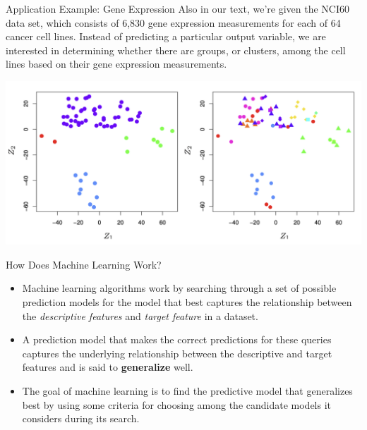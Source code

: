 \documentclass[aspectratio=169,xcolor=dvipsnames]{beamer}
\begin{document}

\begin{frame}{Application Example: Gene Expression}
Also in our text, we're given the NCI60 data set, which consists of 6,830 gene expression measurements for each of 64 cancer cell lines. Instead of predicting a particular output variable, we are interested in determining whether there are groups, or clusters, among the cell lines based on their gene expression measurements.

\begin{center}
\includegraphics[scale=0.4]{images/gene_expr.png}
\end{center}


\end{frame}



\begin{frame}{How Does Machine Learning Work?}
\begin{itemize}
\setlength{\itemsep}{.25cm}

\item Machine learning algorithms work by searching through a set of possible prediction models for the model that best captures the relationship between the \textit{descriptive features} and \textit{target feature} in a dataset.

\item A prediction model that makes the correct predictions for these queries captures the underlying relationship between the descriptive and target features and is said to \textbf{generalize} well.

\item The goal of machine learning is to find the predictive model that generalizes best by using some criteria for choosing among the candidate models it considers during its search.


\end{itemize}
\end{frame}
\end{document}

